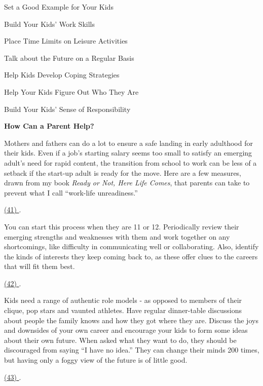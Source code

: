 
\qquad [A] Set a Good Example for Your Kids

\qquad [B] Build Your Kids' Work Skills

\qquad [C] Place Time Limits on Leisure Activities

\qquad [D] Talk about the Future on a Regular Basis

\qquad [E] Help Kids Develop Coping Strategies

\qquad [F] Help Your Kids Figure Out Who They Are

\qquad [G] Build Your Kids' Sense of Responsibility

\begin{center}\textbf{How Can a Parent Help?}\end{center}

\qquad Mothers and fathers can do a lot to ensure a safe landing in early adulthood for their kids. Even if a job's starting salary seems too small to satisfy an emerging adult's need for rapid content, the transition from school to work can be less of a setback if the start-up adult is ready for the move. Here are a few measures, drawn from my book \emph{Ready or Not, Here Life Comes}, that parents can take to prevent what I call ``work-life unreadiness.''

\qquad \ul{(41) \qquad\qquad}.

\qquad You can start this process when they are 11 or 12. Periodically review their emerging strengths and weaknesses with them and work together on any shortcomings, like difficulty in communicating well or collaborating. Also, identify the kinds of interests they keep coming back to, as these offer clues to the careers that will fit them best.

\qquad \ul{(42) \qquad\qquad}.

\qquad Kids need a range of authentic role models - as opposed to members of their clique, pop stars and vaunted athletes. Have regular dinner-table discussions about people the family knows and how they got where they are. Discuss the joys and downsides of your own career and encourage your kids to form some ideas about their own future. When asked what they want to do, they should be discouraged from saying ``I have no idea.'' They can change their minds 200 times, but having only a foggy view of the future is of little good.

\qquad \ul{(43) \qquad\qquad}.

